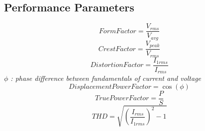 \documentclass[twocolumn, ]{article}
\begin{document}
\subsection{Performance Parameters}
\begin{equation}
Form Factor=\frac{V_{rms}}{V_{avg}}
\end{equation}
\begin{equation}
Crest Factor=\frac{V_{peak}}{V_{rms}}
\end{equation}
\begin{equation}
Distortion Factor=\frac{I_{1rms}}{I_{rms}}
\end{equation}
\textit{$\phi$ : phase difference between fundamentals of current and voltage}
\begin{equation}
Displacement Power Factor=\cos(\phi)
\end{equation}
\begin{equation}
True Power Factor=\frac{P}{S}
\end{equation}
\begin{equation}
THD=\sqrt{(\frac{I_{rms}}{I_{1rms}})^2-1}
\end{equation}
\end{document}

